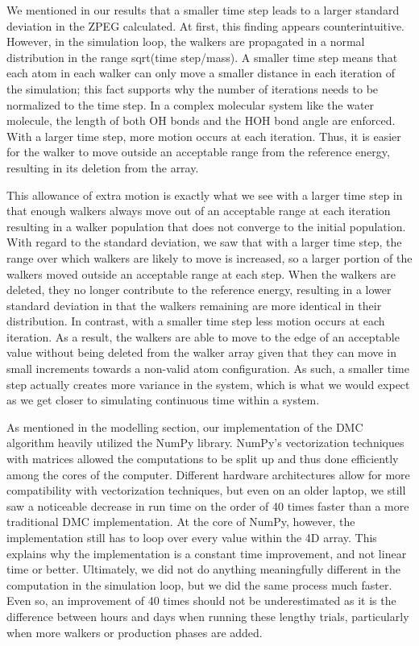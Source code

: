 \documentclass[journal=jacsat,manuscript=article]{achemso}
\begin{document}
We mentioned in our results that a smaller time step leads to a larger standard deviation in the ZPEG calculated. At first, this finding appears counterintuitive. However, in the simulation loop, the walkers are propagated in a normal distribution in the range sqrt(time step/mass). A smaller time step means that each atom in each walker can only move a smaller distance in each iteration of the simulation; this fact supports why the number of iterations needs to be normalized to the time step. In a complex molecular system like the water molecule, the length of both OH bonds and the HOH bond angle are enforced. With a larger time step, more motion occurs at each iteration. Thus, it is easier for the walker to move outside an acceptable range from the reference energy, resulting in its deletion from the array. 

This allowance of extra motion is exactly what we see with a larger time step in that enough walkers always move out of an acceptable range at each iteration resulting in a walker population that does not converge to the initial population. With regard to the standard deviation, we saw that with a larger time step, the range over which walkers are likely to move is increased, so a larger portion of the walkers moved outside an acceptable range at each step. When the walkers are deleted, they no longer contribute to the reference energy, resulting in a lower standard deviation in that the walkers remaining are more identical in their distribution. In contrast, with a smaller time step less motion occurs at each iteration. As a result, the walkers are able to move to the edge of an acceptable value without being deleted from the walker array given that they can move in small increments towards a non-valid atom configuration. As such, a smaller time step actually creates more variance in the system, which is what we would expect as we get closer to simulating continuous time within a system. 

As mentioned in the modelling section, our implementation of the DMC algorithm heavily utilized the NumPy library. NumPy’s vectorization techniques with matrices allowed the computations to be split up and thus done efficiently among the cores of the computer. Different hardware architectures allow for more compatibility with vectorization techniques, but even on an older laptop, we still saw a noticeable decrease in run time on the order of 40 times faster than a more traditional DMC implementation. At the core of NumPy, however, the implementation still has to loop over every value within the 4D array. This explains why the implementation is a constant time improvement, and not linear time or better. Ultimately, we did not do anything meaningfully different in the computation in the simulation loop, but we did the same process much faster. Even so, an improvement of 40 times should not be underestimated as it is the difference between hours and days when running these lengthy trials, particularly when more walkers or production phases are added.
\end{document}
